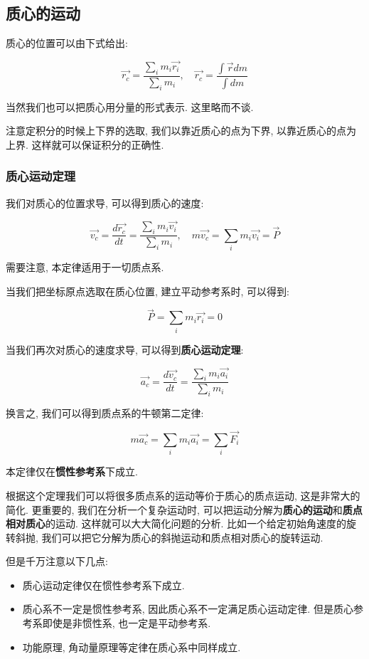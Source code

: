 \documentclass[
  a4paper,
]{ctexrep}
\providecommand{\tightlist}{%
  \setlength{\itemsep}{0pt}\setlength{\parskip}{0pt}}
\begin{document}
\subsection{质心的运动}\label{ux8d28ux5fc3ux7684ux8fd0ux52a8}

质心的位置可以由下式给出:

\[
\vec{r_c} = \frac{\sum_i m_i \vec{r_i}}{\sum_i m_i} , \quad \vec{r_c} = \frac{\int \vec{r} dm}{\int dm}
\]

当然我们也可以把质心用分量的形式表示. 这里略而不谈.

注意定积分的时候上下界的选取, 我们以靠近质心的点为下界,
以靠近质心的点为上界. 这样就可以保证积分的正确性.

\subsubsection{质心运动定理}\label{ux8d28ux5fc3ux8fd0ux52a8ux5b9aux7406}

我们对质心的位置求导, 可以得到质心的速度:

\[
\vec{v_c} = \frac{d\vec{r_c}}{dt} = \frac{\sum_i m_i \vec{v_i}}{\sum_i m_i}, \quad m \vec{v_c} = \sum_i m_i \vec{v_i} = \vec{P}
\]

需要注意, 本定律适用于一切质点系.

当我们把坐标原点选取在质心位置, 建立平动参考系时, 可以得到:

\[\vec{P} = \sum_i m_i \vec{r_i} = 0\]

当我们再次对质心的速度求导, 可以得到\textbf{质心运动定理}:

\[\vec{a_c} = \frac{d\vec{v_c}}{dt} = \frac{\sum_i m_i \vec{a_i}}{\sum_i m_i}\]

换言之, 我们可以得到质点系的牛顿第二定律:

\[m \vec{a_c} = \sum_i m_i \vec{a_i} = \sum_i \vec{F_i}\]

本定律仅在\textbf{惯性参考系}下成立.

根据这个定理我们可以将很多质点系的运动等价于质心的质点运动,
这是非常大的简化. 更重要的, 我们在分析一个复杂运动时,
可以把运动分解为\textbf{质心的运动}和\textbf{质点相对质心}的运动.
这样就可以大大简化问题的分析. 比如一个给定初始角速度的旋转斜抛,
我们可以把它分解为质心的斜抛运动和质点相对质心的旋转运动.

但是千万注意以下几点:

\begin{itemize}
\tightlist
\item
  质心运动定律仅在惯性参考系下成立.
\item
  质心系不一定是惯性参考系, 因此质心系不一定满足质心运动定律.
  但是质心参考系即使是非惯性系, 也一定是平动参考系.
\item
  功能原理, 角动量原理等定律在质心系中同样成立.
\end{itemize}
\end{document}
